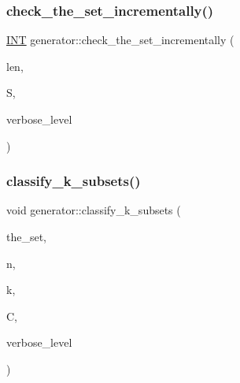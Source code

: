 \subsubsection{\texorpdfstring{check\+\_\+the\+\_\+set\+\_\+incrementally()}{check\_the\_set\_incrementally()}}
{\footnotesize\ttfamily \mbox{\hyperlink{galois_8h_a09fddde158a3a20bd2dcadb609de11dc}{I\+NT}} generator\+::check\+\_\+the\+\_\+set\+\_\+incrementally (\begin{DoxyParamCaption}\item[{\mbox{\hyperlink{galois_8h_a09fddde158a3a20bd2dcadb609de11dc}{I\+NT}}}]{len,  }\item[{\mbox{\hyperlink{galois_8h_a09fddde158a3a20bd2dcadb609de11dc}{I\+NT}} $\ast$}]{S,  }\item[{\mbox{\hyperlink{galois_8h_a09fddde158a3a20bd2dcadb609de11dc}{I\+NT}}}]{verbose\+\_\+level }\end{DoxyParamCaption})}

\mbox{\label{classgenerator_ace87c54ea0877c8b4381c124fa0daf80}} 
\subsubsection{\texorpdfstring{classify\+\_\+k\+\_\+subsets()}{classify\_k\_subsets()}}
{\footnotesize\ttfamily void generator\+::classify\+\_\+k\+\_\+subsets (\begin{DoxyParamCaption}\item[{\mbox{\hyperlink{galois_8h_a09fddde158a3a20bd2dcadb609de11dc}{I\+NT}} $\ast$}]{the\+\_\+set,  }\item[{\mbox{\hyperlink{galois_8h_a09fddde158a3a20bd2dcadb609de11dc}{I\+NT}}}]{n,  }\item[{\mbox{\hyperlink{galois_8h_a09fddde158a3a20bd2dcadb609de11dc}{I\+NT}}}]{k,  }\item[{\mbox{\hyperlink{classclassify}{classify}} $\ast$\&}]{C,  }\item[{\mbox{\hyperlink{galois_8h_a09fddde158a3a20bd2dcadb609de11dc}{I\+NT}}}]{verbose\+\_\+level }\end{DoxyParamCaption})}

\mbox{\label{classgenerator_a97568500aaf76ce2d931cef80a25ee57}} 
